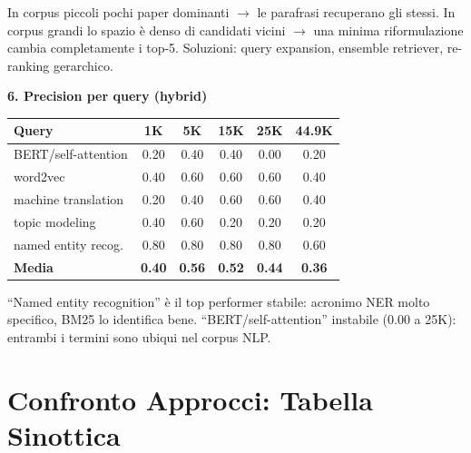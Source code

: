 \documentclass[12pt,a4paper]{article}
\begin{document}
In corpus piccoli pochi paper dominanti $\to$ le parafrasi recuperano gli stessi. In corpus grandi lo spazio \`e denso di candidati vicini $\to$ una minima riformulazione cambia completamente i top-5. Soluzioni: query expansion, ensemble retriever, re-ranking gerarchico.

\textbf{6. Precision per query (hybrid)}
\begin{center}
\begin{tabular}{lccccc}
\toprule
\textbf{Query} & 1K & 5K & 15K & 25K & 44.9K \\
\midrule
BERT/self-attention & 0.20 & 0.40 & 0.40 & 0.00 & 0.20 \\
word2vec            & 0.40 & 0.60 & 0.60 & 0.60 & 0.40 \\
machine translation & 0.20 & 0.40 & 0.60 & 0.60 & 0.40 \\
topic modeling      & 0.40 & 0.60 & 0.20 & 0.20 & 0.20 \\
named entity recog. & 0.80 & 0.80 & 0.80 & 0.80 & 0.60 \\
\midrule
\textbf{Media}      & \textbf{0.40} & \textbf{0.56} & \textbf{0.52} & \textbf{0.44} & \textbf{0.36} \\
\bottomrule
\end{tabular}
\end{center}

``Named entity recognition'' \`e il top performer stabile: acronimo NER molto specifico, BM25 lo identifica bene. ``BERT/self-attention'' instabile (0.00 a 25K): entrambi i termini sono ubiqui nel corpus NLP.

\section{Confronto Approcci: Tabella Sinottica}
\end{document}

